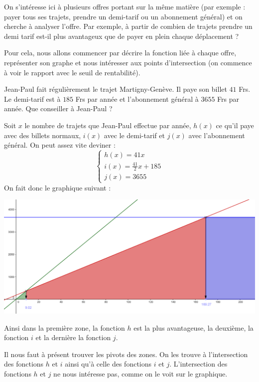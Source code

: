 On s'intéresse ici à plusieurs offres portant sur la même matière (par exemple : payer tous ses  trajets, prendre un demi-tarif ou un abonnement général) et on cherche à analyser l'offre. Par exemple, à partir de combien de trajets prendre un demi tarif est-il plus avantageux que de payer en plein chaque déplacement ?

Pour cela, nous allons commencer par décrire la fonction liée à chaque offre, représenter son graphe et nous intéresser aux points d'intersection (on commence à voir le rapport avec le seuil de rentabilité).

\begin{exemple}
Jean-Paul fait régulièrement le trajet Martigny-Genève. Il paye son billet $41$ Frs. Le demi-tarif est à $185$ Frs par année et l'abonnement général à $3655$ Frs par année. Que conseiller à Jean-Paul ?

Soit $x$ le nombre de trajets que Jean-Paul effectue par année, $h(x)$ ce qu'il paye avec des billets normaux, $i(x)$ avec le demi-tarif et $j(x)$ avec l'abonnement général. On peut assez vite deviner :
$$
\left\{
\begin{array}{l}
h(x) = 41 x\\
i(x) = \frac{41}{2} x + 185\\
j(x) = 3655
\end{array}
\right.
$$
On fait donc le graphique suivant :
\begin{center}
\includegraphics[width = 0.9 \textwidth]{rentabilite/comparatif.png}
\end{center}
Ainsi dans la première zone, la fonction $h$ est la plus avantageuse, la deuxième, la fonction $i$ et la dernière la fonction $j$.

Il nous faut à présent trouver les pivots des zones. On les trouve à l'intersection des fonctions $h$ et $i$ ainsi qu'à celle des fonctions $i$ et $j$. L'intersection des fonctions $h$ et $j$ ne nous intéresse pas, comme on le voit sur le graphique.


\end{exemple}
